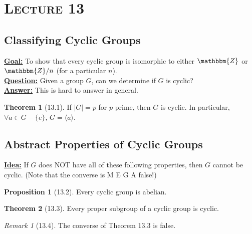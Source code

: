 \documentclass{article}
\newcommand{\Z}{\mathbbm{Z}}
\newcommand{\define}[1]{\textbf{\underline{#1}}}
\theoremstyle{definition}
\newtheorem*{thm}{Theorem}
\newtheorem*{prop}{Proposition}
\theoremstyle{remark}
\newtheorem*{rmk}{Remark}
\newcommand{\cyc}[1]{\langle#1\rangle}
\begin{document}
    \section*{\textbf{\textsc{Lecture 13}}}{
        \subsection*{Classifying Cyclic Groups}{
            \define{Goal:} To show that every cyclic group is isomorphic to either $\Z$ or $\Z/n$ (for a particular $n$).\\
            
            \noindent\define{Question:} Given a group $G$, can we determine if $G$ is cyclic?\\
            \noindent\define{Answer:} This is hard to answer in general.
            
            \begin{thm}[13.1]
                If $|G|=p$ for $p$ prime, then $G$ is cyclic. In particular, $\forall a \in G-\{e\}$, $G=\cyc{a}$.
            \end{thm}
        }
        \subsection*{Abstract Properties of Cyclic Groups}{
            \define{Idea:} If $G$ does NOT have all of these following properties, then $G$ cannot be cyclic. (Note that the converse is M E G A false!)
            
            \begin{prop}[13.2]
                Every cyclic group is abelian.
            \end{prop}
            
            \begin{thm}[13.3]
                Every proper subgroup of a cyclic group is cyclic.
            \end{thm}
            
            \begin{rmk}[13.4]
                The converse of Theorem 13.3 is false.
            \end{rmk}
        }
    }
    
\end{document}
